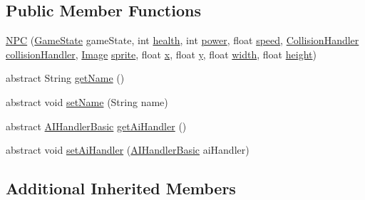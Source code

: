 \subsection*{Public Member Functions}
\begin{DoxyCompactItemize}
\item 
\mbox{\hyperlink{classentities_1_1_n_p_c_ad392912a8fd646f1cdb22562344be5d0}{N\+PC}} (\mbox{\hyperlink{classstates_1_1_game_state}{Game\+State}} game\+State, int \mbox{\hyperlink{classentities_1_1_subject_a8285660fdae3f0b220bbc686cf5c012c}{health}}, int \mbox{\hyperlink{classentities_1_1_subject_a7bd41d6fe9656de66d4a08c4a9565ec4}{power}}, float \mbox{\hyperlink{classentities_1_1_mobile_entity_a815a9d2b23a0bb7e3ee7739d4c10d7c3}{speed}}, \mbox{\hyperlink{classentities_1_1_collision_handler}{Collision\+Handler}} \mbox{\hyperlink{classentities_1_1_mobile_entity_a29fbe797671b1fc81eafe1e48fdc46f9}{collision\+Handler}}, \mbox{\hyperlink{classorg_1_1newdawn_1_1slick_1_1_image}{Image}} \mbox{\hyperlink{classentities_1_1_physical_entity_aeb439b2308ab19fb6d3ff6be6f7cdbd8}{sprite}}, float \mbox{\hyperlink{classorg_1_1newdawn_1_1slick_1_1geom_1_1_shape_a3e985bfff386c15a4efaad03d8ad60d3}{x}}, float \mbox{\hyperlink{classorg_1_1newdawn_1_1slick_1_1geom_1_1_shape_a9f934baded6a1b65ebb69e7e5f80ea00}{y}}, float \mbox{\hyperlink{classorg_1_1newdawn_1_1slick_1_1geom_1_1_rectangle_a967e1823f62daf45abb142779d1be62d}{width}}, float \mbox{\hyperlink{classorg_1_1newdawn_1_1slick_1_1geom_1_1_rectangle_a3bd010fdce636fc11ed0e0ad4d4b4a0a}{height}})
\item 
abstract String \mbox{\hyperlink{classentities_1_1_n_p_c_a82d20902f2142d2621cf93335da23149}{get\+Name}} ()
\item 
abstract void \mbox{\hyperlink{classentities_1_1_n_p_c_aab66c1bf49e6eba132dcf1d21885ee48}{set\+Name}} (String name)
\item 
abstract \mbox{\hyperlink{classentities_1_1_a_i_handler_basic}{A\+I\+Handler\+Basic}} \mbox{\hyperlink{classentities_1_1_n_p_c_ab3791fbd872c3444c2da707a93e9897b}{get\+Ai\+Handler}} ()
\item 
abstract void \mbox{\hyperlink{classentities_1_1_n_p_c_a249e570db56402a0e7784f4419f85ca6}{set\+Ai\+Handler}} (\mbox{\hyperlink{classentities_1_1_a_i_handler_basic}{A\+I\+Handler\+Basic}} ai\+Handler)
\end{DoxyCompactItemize}
\subsection*{Additional Inherited Members}


